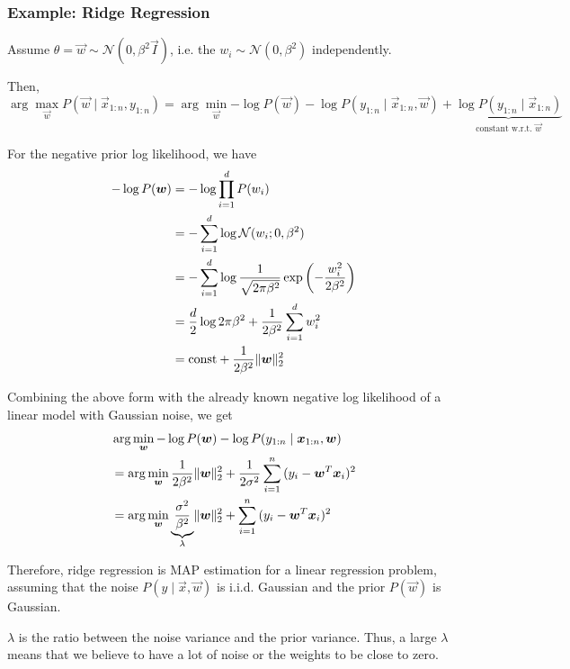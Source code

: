 \subsubsection{Example: Ridge Regression}
Assume $\theta = \vec{w} \sim \mathcal{N}(0, \beta^2 \vec{I})$,
i.e. the $w_i \sim \mathcal{N}(0, \beta^2)$ independently.

Then,
\begin{equation*}
    \arg\max_{\vec{w}}{
        P(\vec{w} \mid \vec{x}_{1:n}, y_{1:n})
    }
    = \arg\min_{\vec{w}}{
        -\log{P(\vec{w})}
        -\log{P(y_{1:n} \mid \vec{x}_{1:n}, \vec{w})}
        + \underbrace{\log{P(y_{1:n} \mid \vec{x}_{1:n})}}_\text{constant w.r.t. $\vec{w}$}
    }
\end{equation*}

For the negative prior log likelihood, we have
\begin{align*}
    -\log{P(\boldsymbol{w})} &=
        -\log{\prod_{i=1}^d{P(w_i)}} \\
    &= - \sum_{i=1}^d{\log{\mathcal{N}(w_i ; 0, \beta^2)}} \\
    &= - \sum_{i=1}^d{\log{
        \frac{1}{\sqrt{2 \pi \beta^2}}
        \exp{\left( -\frac{w_i^2}{2 \beta^2} \right)}
    }} \\
    &= \frac{d}{2} \log{2 \pi \beta^2}
    + \frac{1}{2 \beta^2} \sum_{i=1}^d{w_i^2} \\
    &= \text{const} + \frac{1}{2 \beta^2} \lVert\boldsymbol{w}\rVert_2^2
\end{align*}

Combining the above form with the already known negative log
likelihood of a linear model with Gaussian noise, we get
\begin{align*}
    & \arg\min_{\boldsymbol{w}}{
        -\log{P(\boldsymbol{w})}
        -\log{P(y_{1:n} \mid \boldsymbol{x}_{1:n}, \boldsymbol{w})}
    } \\
    &= \arg\min_{\boldsymbol{w}}{
        \frac{1}{2\beta^2} \lVert\boldsymbol{w}\rVert_2^2
        + \frac{1}{2\sigma^2} \sum_{i=1}^n{(y_i - \boldsymbol{w}^T \boldsymbol{x}_i)^2}
    } \\
    &= \arg\min_{\boldsymbol{w}}{
        \underbrace{\frac{\sigma^2}{\beta^2}}_\lambda \lVert\boldsymbol{w}\rVert_2^2
        + \sum_{i=1}^n{(
        y_i - \boldsymbol{w}^T \boldsymbol{x}_i
        )^2}
    }
\end{align*}

Therefore, ridge regression is MAP estimation
for a linear regression problem, assuming that
the noise $P(y \mid \vec{x}, \vec{w})$ is
i.i.d. Gaussian and the prior $P(\vec{w})$
is Gaussian.

$\lambda$ is the ratio between the noise variance
and the prior variance.
Thus, a large $\lambda$ means that we believe to
have a lot of noise or the weights to be close to zero.


